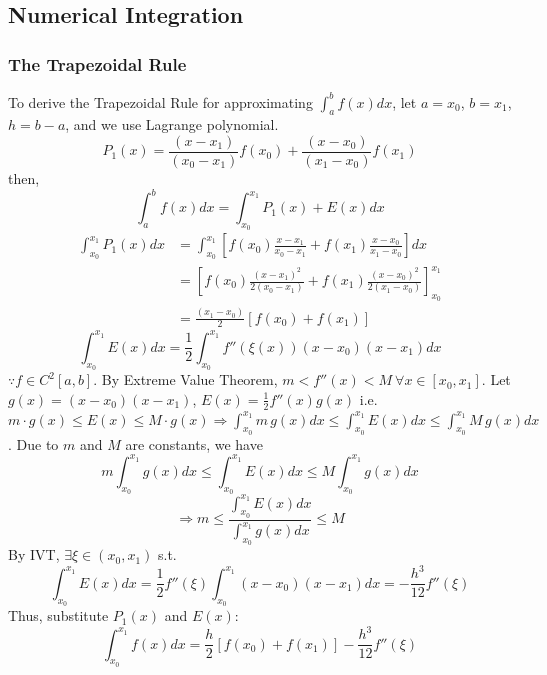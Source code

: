 \documentclass[12pt, a4paper]{article}
\theoremstyle{break}
\begin{document}
\subsection{Numerical Integration}
\subsubsection*{The Trapezoidal Rule}
To derive the Trapezoidal Rule for approximating $\int_a^b f(x) dx$, let $a = x_0$, $b = x_1$, $h = b - a$, and we use Lagrange polynomial.
\[ P_1(x) = \frac{(x-x_1)}{(x_0-x_1)}f(x_0) + \frac{(x-x_0)}{(x_1-x_0)}f(x_1) \]
then, 
\[ \int_a^b f(x) dx = \int_{x_0}^{x_1} P_1(x) + E(x) dx \]
\begin{align*}
\int_{x_0}^{x_1} P_1(x) dx &= \int_{x_0}^{x_1} \left[ f(x_0)\frac{x-x_1}{x_0-x_1} + f(x_1)\frac{x-x_0}{x_1-x_0} \right] dx \\
&= \left[ f(x_0) \frac{(x-x_1)^2}{2(x_0-x_1)} + f(x_1) \frac{(x-x_0)^2}{2(x_1-x_0)} \right]_{x_0}^{x_1} \\
&= \frac{(x_1-x_0)}{2}[f(x_0) + f(x_1)]
\end{align*}
\[ \int_{x_0}^{x_1} E(x) dx = \frac{1}{2} \int_{x_0}^{x_1} f''(\xi(x))(x-x_0)(x-x_1) dx \]
$\because f \in C^2[a,b]$. By Extreme Value Theorem, $m < f''(x) < M \ \forall x \in [x_0, x_1]$. Let $g(x) = (x-x_0)(x-x_1)$, $E(x) = \frac{1}{2}f''(x)g(x)$ i.e. $m \cdot g(x) \le E(x) \le M \cdot g(x) \Rightarrow \int_{x_0}^{x_1} m \, g(x) dx \le \int_{x_0}^{x_1} E(x) dx \le \int_{x_0}^{x_1} M \, g(x) dx$. Due to $m$ and $M$ are constants, we have
\[ m \int_{x_0}^{x_1} g(x) dx \le \int_{x_0}^{x_1} E(x) dx \le M \int_{x_0}^{x_1} g(x) dx \]
\[ \Rightarrow m \le \frac{\int_{x_0}^{x_1} E(x) dx}{\int_{x_0}^{x_1} g(x) dx} \le M \]
By IVT, $\exists \xi \in (x_0, x_1)$ s.t. 
\[ \int_{x_0}^{x_1} E(x) dx = \frac{1}{2} f''(\xi) \int_{x_0}^{x_1} (x-x_0)(x-x_1) dx = -\frac{h^3}{12} f''(\xi) \]
Thus, substitute $P_1(x)$ and $E(x)$:
\[ \int_{x_0}^{x_1} f(x) dx = \frac{h}{2} [f(x_0) + f(x_1)] - \frac{h^3}{12} f''(\xi) \]
\end{document}
